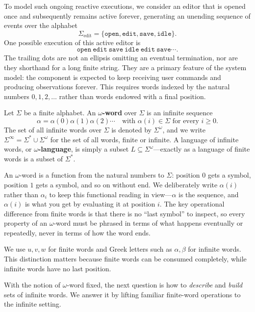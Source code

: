 To model such ongoing reactive executions, we consider an editor that is opened
once and subsequently remains active forever, generating an unending sequence of
events over the alphabet
\[
  \Sigma_{\mathrm{edit}}
  =\{\texttt{open},\texttt{edit},\texttt{save},\texttt{idle}\}.
\]
One possible execution of this active editor is
\[
  \texttt{open}\ \texttt{edit}\ \texttt{save}\ \texttt{idle}\
  \texttt{edit}\ \texttt{save}\cdots .
\]
The trailing dots are not an ellipsis omitting an eventual termination, nor are
they shorthand for a long finite string.  They are a primary feature of the
system model: the component is expected to keep receiving user commands and
producing observations forever.  This requires words indexed by the natural
numbers $0,1,2,\ldots$ rather than words endowed with a final position.

\begin{definition}
\label{def:omega-word}
Let $\Sigma$ be a finite alphabet.  An \textbf{$\omega$-word} over
$\Sigma$ is an infinite sequence
\[
  \alpha=\alpha(0)\alpha(1)\alpha(2)\cdots
  \quad\text{with }\alpha(i)\in\Sigma\text{ for every }i\geq 0.
\]
The set of all infinite words over $\Sigma$ is denoted by
$\Sigma^\omega$, and we write $\Sigma^\infty=\Sigma^*\cup\Sigma^\omega$
for the set of all words, finite or infinite.  A language of infinite
words, or \textbf{$\omega$-language}, is simply a subset
$L\subseteq\Sigma^\omega$---exactly as a language of finite words is a
subset of $\Sigma^*$.
\end{definition}

An $\omega$-word is a function from the natural numbers to $\Sigma$:
position $0$ gets a symbol, position $1$ gets a symbol, and so on
without end.  We deliberately write $\alpha(i)$ rather than $\alpha_i$
to keep this functional reading in view---$\alpha$ is the sequence, and
$\alpha(i)$ is what you get by evaluating it at position $i$.  The key
operational difference from finite words is that there is no ``last
symbol'' to inspect, so every property of an $\omega$-word must be
phrased in terms of what happens eventually or repeatedly, never in
terms of how the word ends.

We use $u,v,w$ for finite words and Greek letters such as
$\alpha,\beta$ for infinite words.  This distinction matters because
finite words can be consumed completely, while infinite words have no
last position.

With the notion of $\omega$-word fixed, the next question is how to
\emph{describe} and \emph{build} sets of infinite words.  We answer it
by lifting familiar finite-word operations to the infinite setting.

